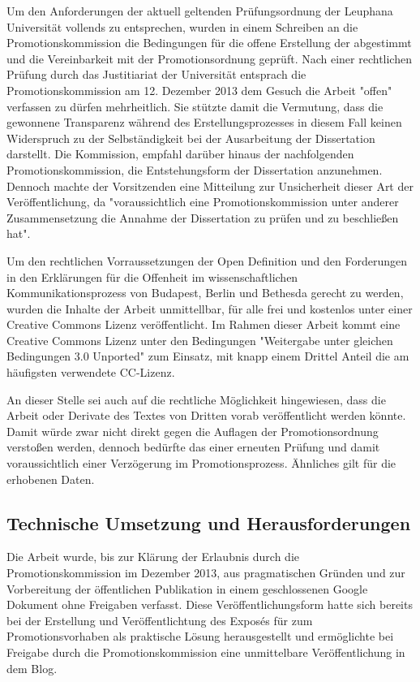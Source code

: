 Um den Anforderungen der aktuell geltenden Prüfungsordnung der Leuphana Universität vollends zu entsprechen, wurden in einem Schreiben an die Promotionskommission die Bedingungen für die offene Erstellung der abgestimmt und die Vereinbarkeit mit der Promotionsordnung geprüft. Nach einer rechtlichen Prüfung durch das Justitiariat der Universität entsprach die Promotionskommission am 12. Dezember 2013 dem Gesuch die Arbeit "offen" verfassen zu dürfen mehrheitlich. Sie stützte damit die Vermutung, dass die gewonnene Transparenz während des Erstellungsprozesses in diesem Fall keinen Widerspruch zu der Selbständigkeit bei der Ausarbeitung der Dissertation darstellt. Die Kommission, empfahl darüber hinaus der nachfolgenden Promotionskommission, die Entstehungsform der Dissertation anzunehmen. Dennoch machte der Vorsitzenden eine Mitteilung zur Unsicherheit dieser Art der Veröffentlichung, da "voraussichtlich eine Promotionskommission unter anderer Zusammensetzung die Annahme der Dissertation zu prüfen und zu beschließen hat".

Um den rechtlichen Vorraussetzungen der Open Definition und den Forderungen in den Erklärungen für die Offenheit im wissenschaftlichen Kommunikationsprozess von Budapest, Berlin und Bethesda gerecht zu werden, wurden die Inhalte der Arbeit unmittellbar, für alle frei und kostenlos unter einer Creative Commons Lizenz veröffentlicht. Im Rahmen dieser Arbeit kommt eine Creative Commons Lizenz unter den Bedingungen "Weitergabe unter gleichen Bedingungen 3.0 Unported" zum Einsatz, mit knapp einem Drittel Anteil die am häufigsten verwendete CC-Lizenz.

An dieser Stelle sei auch auf die rechtliche Möglichkeit hingewiesen, dass die Arbeit oder Derivate des Textes von Dritten vorab veröffentlicht werden könnte. Damit würde zwar nicht direkt gegen die Auflagen der Promotionsordnung verstoßen werden, dennoch bedürfte das einer erneuten Prüfung und damit voraussichtlich einer Verzögerung im Promotionsprozess. Ähnliches gilt für die erhobenen Daten.

\subsection{Technische Umsetzung und Herausforderungen}

Die Arbeit wurde, bis zur Klärung der Erlaubnis durch die Promotionskommission im Dezember 2013, aus pragmatischen Gründen und zur Vorbereitung der öffentlichen Publikation in einem geschlossenen Google Dokument ohne Freigaben verfasst. Diese Veröffentlichungsform hatte sich bereits bei der Erstellung und Veröffentlichtung des Exposés für zum Promotionsvorhaben \cite{heise_2012_expose} als praktische Lösung herausgestellt und ermöglichte bei Freigabe durch die Promotionskommission eine unmittelbare Veröffentlichung in dem Blog.

